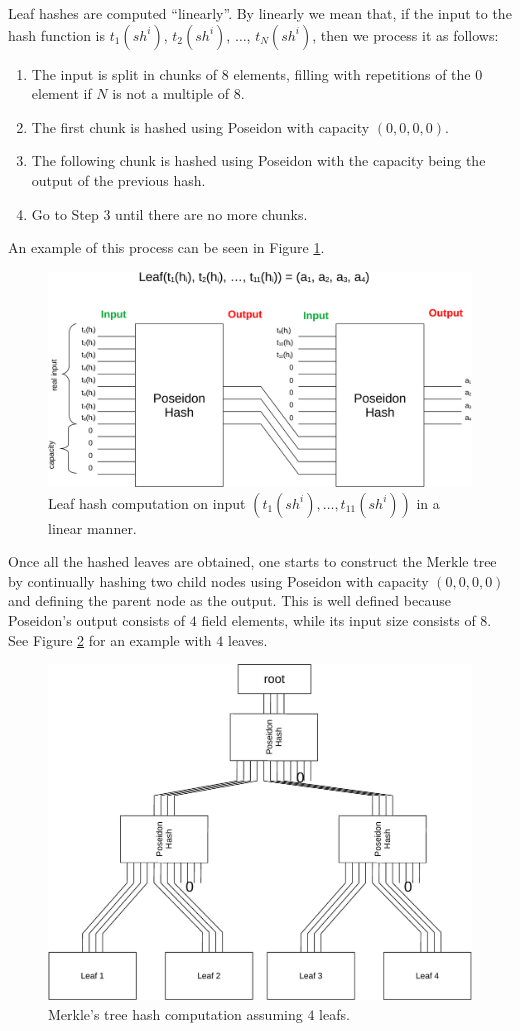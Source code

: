 Leaf hashes are computed ``linearly''. By linearly we mean that, if the input to the hash function is $t_1(sh^i)$, $t_2(sh^i)$, $\dots$, $t_N(sh^i)$, then we process it as follows:
\begin{enumerate}
	\item The input is split in chunks of $8$ elements, filling with repetitions of the $0$ element if $N$ is not a multiple of $8$.
	\item The first chunk is hashed using Poseidon with capacity $(0, 0, 0, 0)$.
	\item The following chunk is hashed using Poseidon with the capacity being the output of the previous hash.
	\item Go to Step 3 until there are no more chunks.
\end{enumerate}

An example of this process can be seen in Figure \ref{fig:linear-hash}.
\begin{figure}[h!]
	\centering
	\includegraphics[width=.7\textwidth]{../figures/poseidon-linear-hash}
	\caption{Leaf hash computation on input $(t_1(sh^i), \dots, t_{11}(sh^i))$ in a linear manner.}
	\label{fig:linear-hash}
\end{figure}

Once all the hashed leaves are obtained, one starts to construct the Merkle tree by continually hashing two child nodes using Poseidon with capacity $(0,0,0,0)$ and defining the parent node as the output. This is well defined because Poseidon's output consists of $4$ field elements, while its input size consists of $8$. See Figure \ref{fig:full-poseidon} for an example with $4$ leaves.
\begin{figure}[H]
	\centering
	\includegraphics[width=.6\textwidth]{../figures/MT-poseidon-example}
	\caption{Merkle's tree hash computation assuming $4$ leafs.}
	\label{fig:full-poseidon}
\end{figure}

